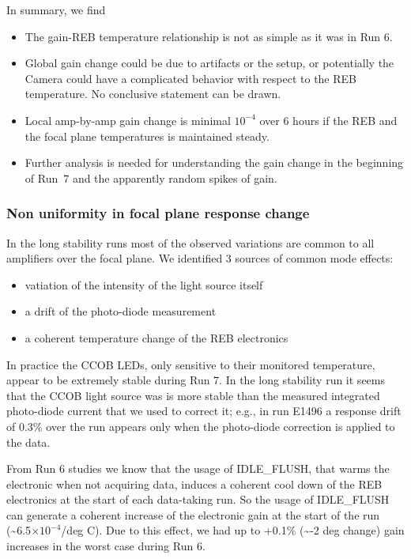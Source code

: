 In summary, we find
\begin{itemize}
    \item The gain-REB temperature relationship is not as simple as it was in Run 6.
    \item Global gain change could be due to  artifacts or the setup, or potentially the Camera could have a complicated behavior with respect to the REB temperature. No conclusive statement can be drawn.
    \item Local amp-by-amp gain change is minimal $10^{-4}$ over 6 hours if the REB and the focal plane temperatures is maintained steady.
    \item Further analysis is needed for understanding the gain change in the beginning of Run~7 and the apparently random spikes of gain.
\end{itemize}

\clearpage

\subsubsection{Non uniformity in focal plane response change}\label{sec:gain-stability-3}
In the long stability runs most of the observed variations are common to all amplifiers over the focal plane. We identified  3 sources of common mode effects:
\begin{itemize}
\item vatiation of the intensity of the light source itself
\item a drift of the photo-diode measurement
\item a coherent temperature change of the REB electronics
\end{itemize}

In practice the CCOB LEDs, only sensitive to their monitored temperature, appear to be extremely stable during Run 7.  In the long stability run  it seems that the CCOB light source was is more stable than the measured integrated photo-diode current that we used to correct it; e.g., in run E1496 a response drift of 0.3\% over the run appears only when the photo-diode correction is applied to the data.

From Run 6 studies we know that the usage of IDLE\_FLUSH, that warms the electronic when not acquiring data, induces  a coherent cool down of the REB electronics at the start of each data-taking run. So  the usage of IDLE\_FLUSH can generate a coherent increase of the electronic gain at the start of the run (\textasciitilde6.5$\times 10^{-4}$/deg C).  Due to this effect, we had up to +0.1\% (\textasciitilde-2 deg change) gain increases in the worst case during  Run 6.

